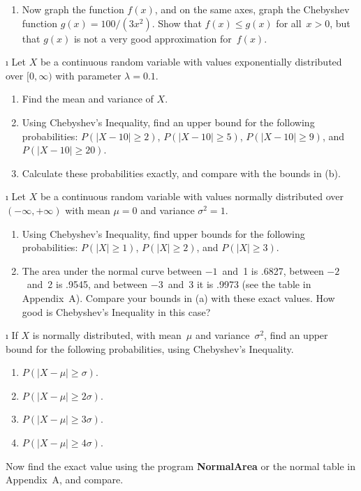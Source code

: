 {\begin{LJSItem}
\begin{enumerate}
\item Now graph the function $f(x)$, and on the same axes, graph the
Chebyshev function $g(x) = 100/(3x^2)$.  Show that $f(x) \leq g(x)$ for all~$x >
0$, but that $g(x)$ is not a very good approximation for~$f(x)$.
\end{enumerate}

\i\label{exer 8.2.100} Let $X$ be a continuous random variable with values exponentially
distributed over $[0,\infty)$ with parameter $\lambda = 0.1$.
\begin{enumerate}
\item Find the mean and variance of $X$.

\item Using Chebyshev's Inequality, find an upper bound for the following
probabilities: $P(|X - 10| \geq 2)$, $P(|X - 10| \geq 5)$, $P(|X - 10| \geq
9)$, and $P(|X - 10| \geq 20)$.

\item Calculate these probabilities exactly, and compare with the bounds in
(b).
\end{enumerate}
\i\label{exer 8.2.101} Let $X$ be a continuous random variable with values normally
distributed over $(-\infty,+\infty)$ with mean $\mu = 0$ and variance $\sigma^2 = 1$.
\begin{enumerate}
\item Using Chebyshev's Inequality, find upper bounds for the following
probabilities: $P(|X| \geq 1)$, $P(|X| \geq 2)$, and $P(|X| \geq 3)$.

\item The area under the normal curve between $-1$~and~1 is .6827, between
$-2$~and~2 is .9545, and between $-3$~and~3 it is .9973 (see the table in
Appendix~A).  Compare your bounds in (a) with
these exact values.  How good is Chebyshev's Inequality in this case?
\end{enumerate}

\i\label{exer 8.2.102} If $X$ is normally distributed, with mean~$\mu$ and
variance~$\sigma^2$, find an upper bound for the following probabilities, using Chebyshev's
Inequality.
\begin{enumerate}
\item $P(|X - \mu| \geq \sigma)$.

\item $P(|X - \mu| \geq 2\sigma)$.

\item $P(|X - \mu| \geq 3\sigma)$.

\item $P(|X - \mu| \geq 4\sigma)$.
\end{enumerate}
\noindent Now find the exact value using the program {\bf NormalArea}
or the normal table in Appendix~A, and compare.


\end{LJSItem}}
